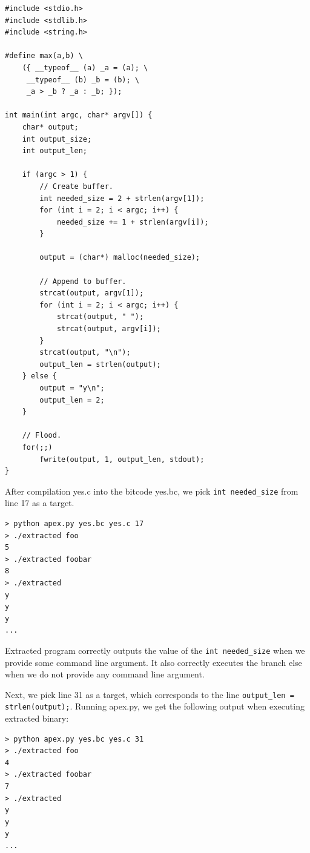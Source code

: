 \documentclass[12pt, twoside]{fithesis2}
\renewcommand{\_}{\leavevmode \kern0.07em\vbox{\hrule width0.4em}}
\begin{document}
\begin{verbatim}
#include <stdio.h>
#include <stdlib.h>
#include <string.h>

#define max(a,b) \
    ({ __typeof__ (a) _a = (a); \
     __typeof__ (b) _b = (b); \
     _a > _b ? _a : _b; });

int main(int argc, char* argv[]) {
    char* output;
    int output_size;
    int output_len;

    if (argc > 1) {
        // Create buffer.
        int needed_size = 2 + strlen(argv[1]);
        for (int i = 2; i < argc; i++) {
            needed_size += 1 + strlen(argv[i]);
        }

        output = (char*) malloc(needed_size);

        // Append to buffer.
        strcat(output, argv[1]);
        for (int i = 2; i < argc; i++) {
            strcat(output, " ");
            strcat(output, argv[i]);
        }
        strcat(output, "\n");
        output_len = strlen(output);
    } else {
        output = "y\n";
        output_len = 2;
    }

    // Flood.
    for(;;)
        fwrite(output, 1, output_len, stdout);
}
\end{verbatim}

After compilation yes.c into the bitcode yes.bc, we pick
\texttt{int needed_size} from line 17 as a target.

\begin{verbatim}
> python apex.py yes.bc yes.c 17
> ./extracted foo
5
> ./extracted foobar
8
> ./extracted
y
y
y
...
\end{verbatim}

Extracted program correctly outputs the value of the
\texttt{int needed_size} when we provide some command line argument.
It also correctly executes the branch else when we do not provide any command
line argument.

Next, we pick line 31 as a target, which corresponds to the line
\texttt{output_len = strlen(output);}.
Running apex.py, we get the following output when executing extracted binary:

\begin{verbatim}
> python apex.py yes.bc yes.c 31
> ./extracted foo
4
> ./extracted foobar
7
> ./extracted
y
y
y
...
\end{verbatim}
\end{document}
